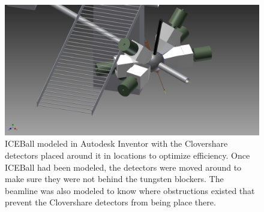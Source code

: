 \begin{figure}
    \centering
    \includegraphics[scale=0.3]{Setup_Figs/FullyAssembled-50cm-newpositions-rightiso.png}
    \caption{ICEBall modeled in Autodesk Inventor \citep{autodesk:_inventor} with the Clovershare detectors placed around it in locations to optimize efficiency. Once ICEBall had been modeled, the detectors were moved around to make sure they were not behind the tungsten blockers. The beamline was also modeled to know where obstructions existed that prevent the Clovershare detectors from being place there.}
    \label{fig:inventor}
\end{figure}
